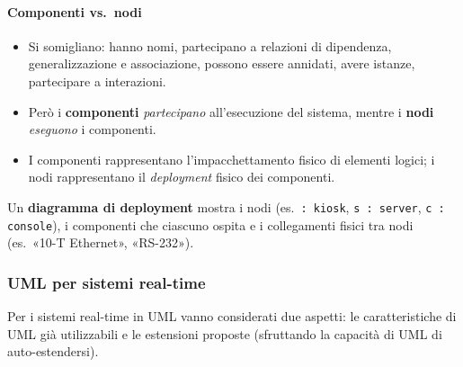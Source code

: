 \documentclass[a4paper,12pt]{article}
\begin{document}
\paragraph{Componenti vs.\ nodi}
\begin{itemize}
  \item Si somigliano: hanno nomi, partecipano a relazioni di dipendenza,
        generalizzazione e associazione, possono essere annidati, avere istanze,
        partecipare a interazioni.
  \item Però i \textbf{componenti} \emph{partecipano} all'esecuzione del sistema,
        mentre i \textbf{nodi} \emph{eseguono} i componenti.
  \item I componenti rappresentano l'impacchettamento fisico di elementi logici; i nodi
        rappresentano il \emph{deployment} fisico dei componenti.
\end{itemize}
Un \textbf{diagramma di deployment} mostra i nodi (es.\ \texttt{: kiosk},
\texttt{s : server}, \texttt{c : console}), i componenti che ciascuno ospita e i
collegamenti fisici tra nodi (es.\ «10-T
Ethernet», «RS-232»).

\subsubsection{UML per sistemi real-time}
Per i sistemi real-time in UML vanno considerati due aspetti: le caratteristiche di UML
già utilizzabili e le estensioni proposte (sfruttando la capacità di UML di
auto-estendersi).
\end{document}
